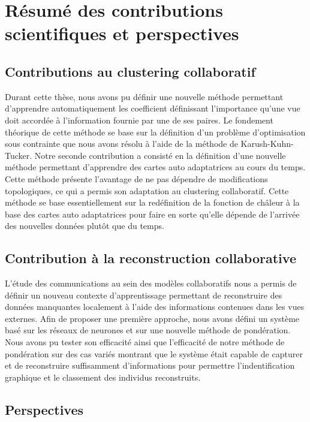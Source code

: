 \documentclass[a4paper]{article}
\begin{document}
\section{R\'{e}sum\'{e} des contributions scientifiques et perspectives}

\subsection{Contributions au clustering collaboratif}

Durant cette thèse, nous avons pu définir une nouvelle méthode permettant d'apprendre automatiquement les coefficient définissant l'importance qu'une vue doit accordée à l'information fournie par une de ses paires. Le fondement théorique de cette méthode se base sur la définition d'un problème d'optimisation sous contrainte que nous avons résolu à l'aide de la méthode de Karush-Kuhn-Tucker.
Notre seconde contribution a consisté en la définition d'une nouvelle méthode permettant d'apprendre des cartes auto adaptatrices au cours du temps. Cette méthode présente l'avantage de ne pas dépendre de modifications topologiques, ce qui a permis son adaptation au clustering collaboratif. Cette méthode se base essentiellement sur la redéfinition de la fonction de châleur à la base des cartes auto adaptatrices pour faire en sorte qu'elle dépende de l'arrivée des nouvelles données plutôt que du temps.

\subsection{Contribution à la reconstruction collaborative}

L'étude des communications au sein des modèles collaboratifs nous a permis de définir un nouveau contexte d'apprentissage permettant de reconstruire des données manquantes localement à l'aide des informations contenues dans les vues externes. Afin de proposer une première approche, nous avons défini un système basé sur les réseaux de neurones et sur une nouvelle méthode de pondération. Nous avons pu tester son efficacité ainsi que l'efficacité de notre méthode de pondération sur des cas variés montrant que le système était capable de capturer et de reconstruire suffisamment d'informations pour permettre l'indentification graphique et le classement des individus reconstruits.

\subsection{Perspectives}
\end{document}
